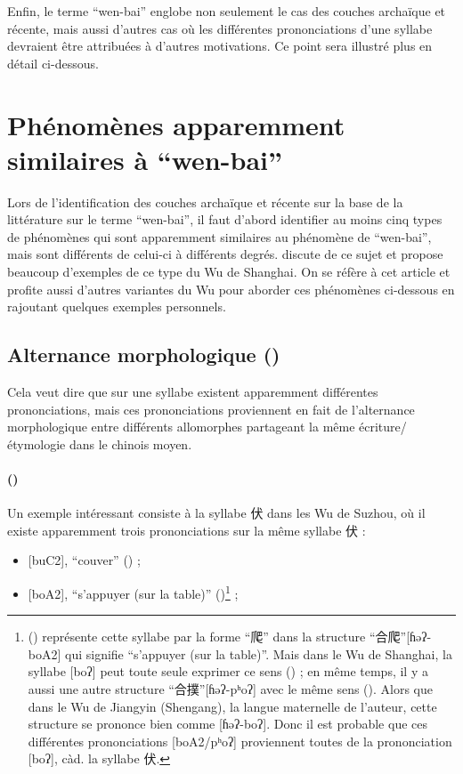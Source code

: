 \documentclass{scrbook}
\newcounter{c}[subsubsection]
\newcommand{\stpc}[1]{\stepcounter{#1}}
\newcommand{\difwenbai}{couches archaïque et récente\xspace}
\begin{document}
\begin{sloppypar}
Enfin, le terme ``wen-bai'' englobe non seulement le cas des \difwenbai, mais aussi d'autres cas où les différentes prononciations d'une syllabe devraient être attribuées à d'autres motivations. Ce point sera illustré plus en détail ci-dessous.

\section{Phénomènes apparemment similaires à ``wen-bai''}\label{phnmn_idtf}
Lors de l'identification des \difwenbai sur la base de la littérature sur le terme ``wen-bai'', il faut d'abord identifier au moins cinq types de phénomènes qui sont apparemment similaires au phénomène de ``wen-bai'', mais sont différents de celui-ci à différents degrés. \textcite{Shen1988shanghai} discute de ce sujet et propose beaucoup d'exemples de ce type du Wu de Shanghai. On se réfère à cet article et profite aussi d'autres variantes du Wu pour aborder ces phénomènes ci-dessous en rajoutant quelques exemples personnels.

\subsection{Alternance morphologique (\cite[134]{Shen1988shanghai})}\label{phenom1}
Cela veut dire que sur une syllabe existent apparemment différentes prononciations, mais ces prononciations proviennent en fait de l'alternance morphologique entre différents allomorphes partageant la même écriture/étymologie dans le chinois moyen. 

\stpc{c}\paragraph{()}
Un exemple intéressant consiste à la syllabe 伏 dans les Wu de Suzhou, où il existe apparemment trois prononciations sur la même syllabe 伏 : 

\begin{itemize}
\item{[buC2], ``couver'' (\cite[27]{Ye1993Suzhou}) ;}

\item{[boA2], ``s'appuyer (sur la table)'' (\cite[277]{Ye1993Suzhou})\footnote{(\cite[277]{Ye1993Suzhou}) représente cette syllabe par la forme ``爬'' dans la structure ``合爬''[ɦəʔ-boA2] qui signifie ``s'appuyer (sur la table)''. Mais dans le Wu de Shanghai, la syllabe [boʔ] peut toute seule exprimer ce sens (\cite[381]{Xu1997shanghai}) ; en même temps, il y a aussi une autre structure ``合撲''[ɦəʔ-pʰoʔ] avec le même sens (\cite[348]{Xu1997shanghai}). Alors que dans le Wu de Jiangyin (Shengang), la langue maternelle de l'auteur, cette structure se prononce bien comme [ɦəʔ-boʔ]. Donc il est probable que ces différentes prononciations [boA2/pʰoʔ] proviennent toutes de la prononciation [boʔ], càd. la syllabe 伏.} ;}


\end{itemize}
\end{sloppypar}
\end{document}
